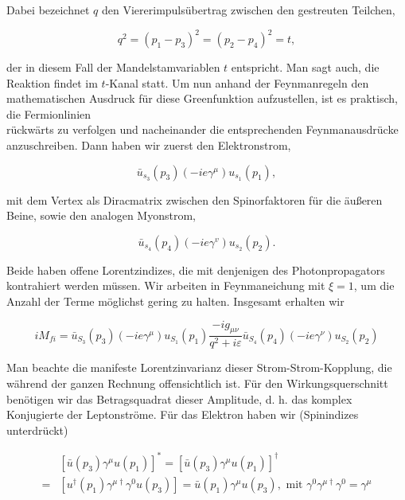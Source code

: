 \documentclass[10pt, letterpaper]{article}
\begin{document}
Dabei bezeichnet $q$ den Viererimpulsübertrag zwischen den gestreuten Teilchen,

$$
q^{2}=\left(p_{1}-p_{3}\right)^{2}=\left(p_{2}-p_{4}\right)^{2}=t,
$$

der in diesem Fall der Mandelstamvariablen $t$ entspricht. Man sagt auch, die Reaktion findet im $t$-Kanal statt. Um nun anhand der Feynmanregeln den mathematischen Ausdruck für diese Greenfunktion aufzustellen, ist es praktisch, die Fermionlinien\\
rückwärts zu verfolgen und nacheinander die entsprechenden Feynmanausdrücke anzuschreiben. Dann haben wir zuerst den Elektronstrom,

$$
\bar{u}_{s_{3}}\left(p_{3}\right)\left(-i e \gamma^{\mu}\right) u_{s_{1}}\left(p_{1}\right),
$$

mit dem Vertex als Diracmatrix zwischen den Spinorfaktoren für die äußeren Beine, sowie den analogen Myonstrom,

$$
\bar{u}_{s_{4}}\left(p_{4}\right)\left(-i e \gamma^{v}\right) u_{s_{2}}\left(p_{2}\right) .
$$

Beide haben offene Lorentzindizes, die mit denjenigen des Photonpropagators kontrahiert werden müssen. Wir arbeiten in Feynmaneichung mit $\xi=1$, um die Anzahl der Terme möglichst gering zu halten. Insgesamt erhalten wir

$$
i M_{f i}=\bar{u}_{S_{3}}\left(p_{3}\right)\left(-i e \gamma^{\mu}\right) u_{S_{1}}\left(p_{1}\right) \frac{-i g_{\mu \nu}}{q^{2}+i \varepsilon} \bar{u}_{S_{4}}\left(p_{4}\right)\left(-i e \gamma^{\nu}\right) u_{S_{2}}\left(p_{2}\right)
$$

Man beachte die manifeste Lorentzinvarianz dieser Strom-Strom-Kopplung, die während der ganzen Rechnung offensichtlich ist. Für den Wirkungsquerschnitt benötigen wir das Betragsquadrat dieser Amplitude, d. h. das komplex Konjugierte der Leptonströme. Für das Elektron haben wir (Spinindizes unterdrückt)

$$
\begin{aligned}
& {\left[\bar{u}\left(p_{3}\right) \gamma^{\mu} u\left(p_{1}\right)\right]^{*}=\left[\bar{u}\left(p_{3}\right) \gamma^{\mu} u\left(p_{1}\right)\right]^{\dagger} } \\
= & {\left[u^{\dagger}\left(p_{1}\right) \gamma^{\mu \dagger} \gamma^{0} u\left(p_{3}\right)\right]=\bar{u}\left(p_{1}\right) \gamma^{\mu} u\left(p_{3}\right), \text { mit } \gamma^{0} \gamma^{\mu \dagger} \gamma^{0}=\gamma^{\mu} }
\end{aligned}
$$
\end{document}
